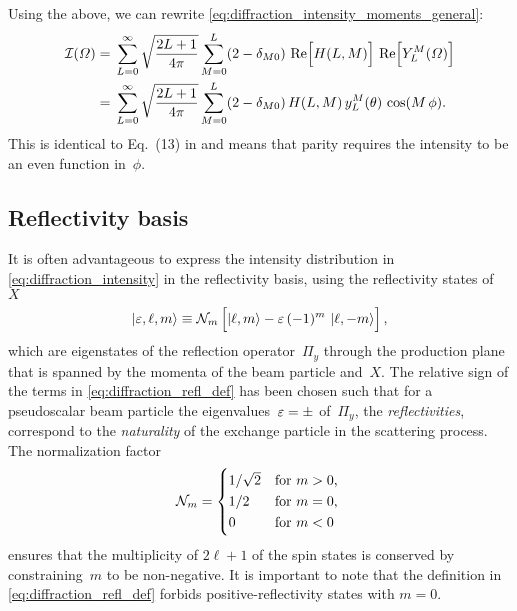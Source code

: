 Using the above, we can rewrite \cref{eq:diffraction_intensity_moments_general}:
\begin{align}
  \intensity(\Omega)
  ={}& \sum_{L = 0}^\infty \sqrt{\frac{2 L + 1}{4 \pi}} \sum_{M = 0}^{L} (2 - \delta_{M 0})\, \Re[2]{H(L, M)}\, \Re[2]{Y_L^M(\Omega)} \nonumber
  \\
  \label{eq:diffraction_intensity_moments_real}
  ={}& \sum_{L = 0}^\infty \sqrt{\frac{2 L + 1}{4 \pi}} \sum_{M = 0}^{L} (2 - \delta_{M 0})\, H(L, M)\, y_L^M(\theta)\, \cos(M\, \phi).
\end{align}
This is identical to Eq.~(13) in  and means that
parity requires the intensity to be an even function in~$\phi$.


\subsection{Reflectivity basis}%
\label{sec:diffraction:reflectivity}

It is often advantageous to express the intensity distribution in
\cref{eq:diffraction_intensity} in the reflectivity basis, \ie using
the reflectivity states of~$X$
\begin{equation}
  \label{eq:diffraction_refl_def}
  \ket{\refl, \ell, m}
  \equiv \mathcal{N}_m \sBrk[2]{\ket{\ell, m} - \refl\, (-1)^m\, \ket{\ell, {-m}}},
\end{equation}
which are eigenstates of the reflection operator~$\Pi_y$ through the
production plane that is spanned by the momenta of the beam particle
and~$X$.  The relative sign of the terms in
\cref{eq:diffraction_refl_def} has been chosen such that for a
pseudoscalar beam particle the eigenvalues~$\varepsilon = \pm$ of~$\Pi_y$,
\ie the \emph{reflectivities}, correspond to the \emph{naturality} of
the exchange particle in the scattering process.  The normalization
factor
\begin{equation}
  \label{eq:refl_norm}
  \mathcal{N}_m
  = \begin{cases*}
      1 / \sqrt{2} & for $m > 0$, \\
      1 / 2        & for $m = 0$, \\
      0            & for $m < 0$
    \end{cases*}
\end{equation}
ensures that the multiplicity of $2 \ell + 1$ of the spin states is
conserved by constraining~$m$ to be non-negative.  It is important to
note that the definition in \cref{eq:diffraction_refl_def} forbids
positive-reflectivity states with $m = 0$.

